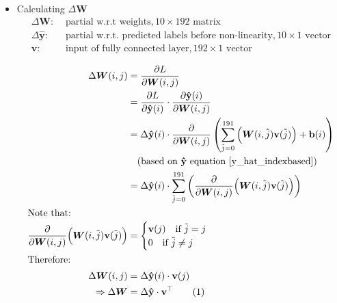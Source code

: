 \documentclass[12pt]{article}
\renewcommand{\vec}[1]{\mathbf{#1}}
\newcommand\numberthis{\stepcounter{equation}\tag{\theequation}}
\begin{document}
\begin{itemize}
\item Calculating $\Delta \bm{W}$
\begin{align*}
    \Delta \bm{W}:& \text{ partial w.r.t weights}, 10 \times 192 \text{ matrix}\\
    \Delta{\vec{\hat{y}}}:& \text{ partial w.r.t. predicted labels before non-linearity}, 10 \times 1 \text{ vector}\\
    \vec{v}:& \text{ input of fully connected layer}, 192 \times 1 \text{ vector}\\
\end{align*}
\begin{align*}
    \Delta \bm{W}(i, j)
    &= \frac{\partial{L}}{\partial{\bm{W}(i, j)}}
    \\
    &= \frac{\partial{L}}{\partial{\vec{\hat{y}}(i)}}
    \cdot
    \frac{\partial{\vec{\hat{y}}(i)}}{\partial{\bm{W}(i, j)}}
    \\
    &= \Delta{\vec{\hat{y}}}(i)
    \cdot
    \frac{\partial}{\partial{\bm{W}(i, j)}}\left(\sum_{\Tilde{j} = 0}^{191}\Big(\bm{W}(i, \Tilde{j})\vec{v}(\Tilde{j})\Big) + \vec{b}(i)\right)
    \\
    &\quad (\text{based on $\vec{\hat{y}}$ equation } \eqref{y_hat_indexbased})
    \\
    &= \Delta{\vec{\hat{y}}}(i)
    \cdot
    \sum_{\Tilde{j} = 0}^{191} \left(\frac{\partial}{\partial{\bm{W}(i, j)}}\Big(\bm{W}(i, \Tilde{j})\vec{v}(\Tilde{j})\Big)\right)
    \\
    \intertext{Note that:}
    \frac{\partial}{\partial{\bm{W}(i, j)}}\Big(\bm{W}(i, \Tilde{j})\vec{v}(\Tilde{j})\Big)
    &=
    \begin{cases}
        \vec{v}(j) \quad \text{if } \Tilde{j} = j\\
        0 \quad \text{if } \Tilde{j} \not = j\\
    \end{cases}
    \\
    \intertext{Therefore:}
    \Delta \bm{W}(i, j)
    &= \Delta{\vec{\hat{y}}}(i) \cdot \vec{v}(j)
    \\
    \Rightarrow \Delta \bm{W} &= \Delta{\vec{\hat{y}}} \cdot \vec{v}^\top
    \numberthis \label{delta_W}
\end{align*}


\end{itemize}
\end{document}
